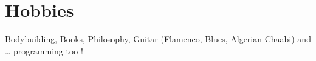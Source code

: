 \section{Hobbies}
 \resumeSubHeadingListStart
 \renewcommand{\labelitemi}{-}
 \setlength{\itemindent}{-15pt}
 \item{Bodybuilding, Books, Philosophy, Guitar (Flamenco, Blues, Algerian Chaabi) and … programming too !}
 \resumeSubHeadingListEnd